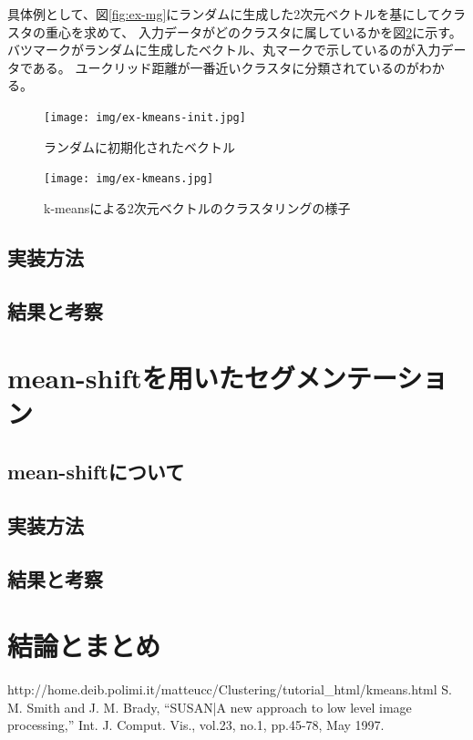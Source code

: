 \documentclass[11pt,a4j]{jsarticle}
\begin{document}
    具体例として、図\ref{fig:ex-mg}にランダムに生成した2次元ベクトルを基にしてクラスタの重心を求めて、
    入力データがどのクラスタに属しているかを図\ref{fig:ex-kmeans}に示す。
    バツマークがランダムに生成したベクトル、丸マークで示しているのが入力データである。
    ユークリッド距離が一番近いクラスタに分類されているのがわかる。

    \begin{figure}[H]
        \centering
        \texttt{[image: img/ex-kmeans-init.jpg]}
        \caption{ランダムに初期化されたベクトル\label{fig:ex-kmeans-init}}
    \end{figure} 

    \begin{figure}[H]
        \centering
        \texttt{[image: img/ex-kmeans.jpg]}
        \caption{k-meansによる2次元ベクトルのクラスタリングの様子\label{fig:ex-kmeans}}
    \end{figure} 
    \subsection{実装方法}
    \subsection{結果と考察}

    \section{mean-shiftを用いたセグメンテーション}
    \subsection{mean-shiftについて}
    \subsection{実装方法}
    \subsection{結果と考察}

    \section{結論とまとめ}

    \begin{thebibliography}{9}
         http://home.deib.polimi.it/matteucc/Clustering/tutorial_html/kmeans.html
         S. M. Smith and J. M. Brady,
          ``SUSAN|A new approach to low level image processing,'' Int. J. Comput.
          Vis., vol.23, no.1, pp.45-78, May 1997.
      \end{thebibliography}
\end{document}
